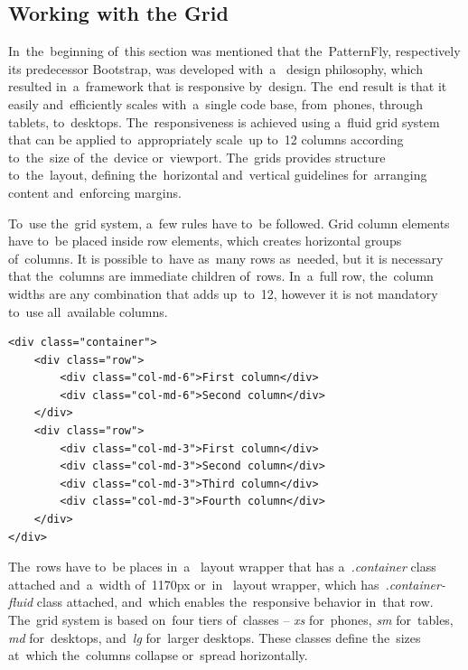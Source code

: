 \subsection{Working with the Grid}
In~the~beginning of~this section was mentioned that the~PatternFly, respectively
its predecessor Bootstrap, was developed with~a~ design
philosophy, which resulted in~a~framework that is responsive by~design. The~end
result is that it easily and~efficiently scales with~a~single code base,
from~phones, through tablets, to~desktops. The~responsiveness is achieved using
a~fluid grid system that can be applied to~appropriately scale~up to~12 columns
according to~the~size of~the~device or~viewport. The~grids provides structure
to~the~layout, defining the~horizontal and~vertical guidelines for~arranging
content and~enforcing margins.

To~use the~grid system, a~few rules have to~be followed. Grid column elements
have to~be placed inside row elements, which creates horizontal groups
of~columns. It is possible to~have as~many rows as~needed, but it is necessary
that the~columns are immediate children of~rows. In~a~full row, the~column
widths are any combination that adds up~to~12, however it is not mandatory
to~use all~available columns.

\begin{lstlisting}[caption=An~illustration of~the~grid system in~PatternFly.,
label=lst-grid, style=dp-html]
<div class="container">
	<div class="row">
		<div class="col-md-6">First column</div>
		<div class="col-md-6">Second column</div>
	</div>
	<div class="row">
		<div class="col-md-3">First column</div>
		<div class="col-md-3">Second column</div>
		<div class="col-md-3">Third column</div>
		<div class="col-md-3">Fourth column</div>
	</div>
</div>
\end{lstlisting}

The~rows have to~be places in~a~ layout wrapper that has
a~\textit{.container} class attached and~a~width of~1170px or~in~
layout wrapper, which has~\textit{.container-fluid} class attached, and~which
enables the~responsive behavior in~that row. The~grid system is based on~four
tiers of~classes -- \textit{xs} for~phones, \textit{sm} for~tables, \textit{md}
for~desktops, and~\textit{lg} for~larger desktops. These classes define
the~sizes at~which the~columns collapse or~spread horizontally. 
  



